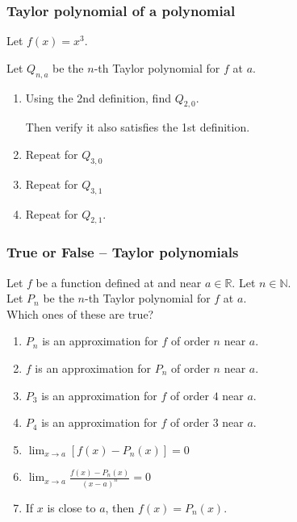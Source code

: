 \documentclass[14pt]{beamer}
\begin{document}
	\begin{frame}[t]
		\frametitle{Taylor polynomial of a polynomial}

		Let $f(x) = x^{3}$.

		Let $Q_{n,a}$ be the $n$-th Taylor polynomial for $f$ at $a$.
		\vspace{.2cm}

		\begin{enumerate}
			\item Using the 2nd definition, find $Q_{2,0}$.

				Then verify it also satisfies the 1st definition.
				\vspace{.2cm}

			\item Repeat for $Q_{3,0}$
				\vspace{.2cm}

			\item Repeat for $Q_{3,1}$
				\vspace{.2cm}

			\item Repeat for $Q_{2,1}$.
		\end{enumerate}
	\end{frame}

	\begin{frame}[t]
		\fontsize{13}{13}\selectfont
		\frametitle{True or False -- Taylor polynomials}

		Let $f$ be a function defined at and near $a \in \mathbb{R}$. Let
		$\displaystyle n \in \mathbb{N}$. \\ Let $P_{n}$ be the $n$-th Taylor polynomial
		for $f$ at $a$. \\ Which ones of these are true?

		\begin{enumerate}
			\item $P_{n}$ is an approximation for $f$ of order $n$ near $a$.
				\vfill

			\item $f$ is an approximation for $P_{n}$ of order $n$ near $a$.
				\vfill

			\item $P_{3}$ is an approximation for $f$ of order $4$ near $a$.
				\vfill

			\item $P_{4}$ is an approximation for $f$ of order $3$ near $a$.
				\vfill

			\item $\displaystyle \lim_{x \to a}\left[ f(x) - P_{n}(x) \right] = 0$
				\vfill

			\item $\displaystyle \lim_{x \to a}\frac{f(x) - P_{n}(x)}{(x-a)^{n}}= 0$
				\vfill

			\item If $x$ is close to $a$, then $f(x) = P_{n}(x)$.
				\vfill
		\end{enumerate}
	\end{frame}
\end{document}
